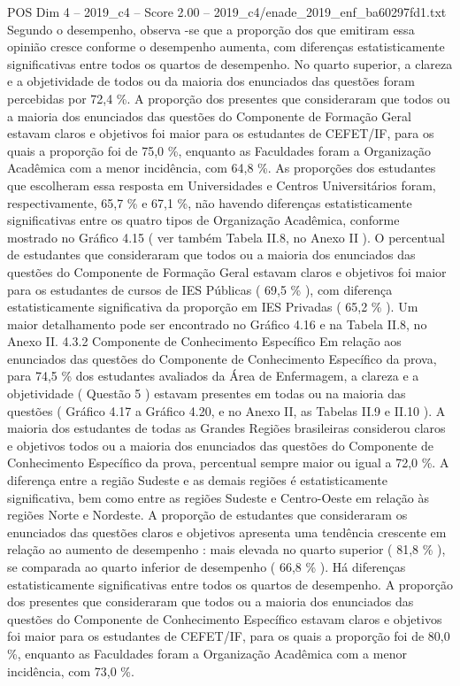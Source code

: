 \begin{textsample}{POS Dim 4 – 2019\_c4 – Score 2.00 – 2019\_c4/enade\_2019\_enf\_ba60297fd1.txt}
Segundo o desempenho, observa -se que a proporção dos que emitiram essa opinião cresce conforme o desempenho aumenta, com diferenças estatisticamente significativas entre todos os quartos de desempenho.
No quarto superior, a clareza e a objetividade de todos ou da maioria dos enunciados das questões foram percebidas por 72,4 \%.
A proporção dos presentes que consideraram que todos ou a maioria dos enunciados das questões do Componente de Formação Geral estavam claros e objetivos foi maior para os estudantes de CEFET/IF, para os quais a proporção foi de 75,0 \%, enquanto as Faculdades foram a Organização Acadêmica com a menor incidência, com 64,8 \%.
As proporções dos estudantes que escolheram essa resposta em Universidades e Centros Universitários foram, respectivamente, 65,7 \% e 67,1 \%, não havendo diferenças estatisticamente significativas entre os quatro tipos de Organização Acadêmica, conforme mostrado no Gráfico 4.15 ( ver também Tabela II.8, no Anexo II ).
O percentual de estudantes que consideraram que todos ou a maioria dos enunciados das questões do Componente de Formação Geral estavam claros e objetivos foi maior para os estudantes de cursos de IES Públicas ( 69,5 \% ), com diferença estatisticamente significativa da proporção em IES Privadas ( 65,2 \% ).
Um maior detalhamento pode ser encontrado no Gráfico 4.16 e na Tabela II.8, no Anexo II. 4.3.2 Componente de Conhecimento Específico Em relação aos enunciados das questões do Componente de Conhecimento Específico da prova, para 74,5 \% dos estudantes avaliados da Área de Enfermagem, a clareza e a objetividade ( Questão 5 ) estavam presentes em todas ou na maioria das questões ( Gráfico 4.17 a Gráfico 4.20, e no Anexo II, as Tabelas II.9 e II.10 ).
A maioria dos estudantes de todas as Grandes Regiões brasileiras considerou claros e objetivos todos ou a maioria dos enunciados das questões do Componente de Conhecimento Específico da prova, percentual sempre maior ou igual a 72,0 \%.
A diferença entre a região Sudeste e as demais regiões é estatisticamente significativa, bem como entre as regiões Sudeste e Centro-Oeste em relação às regiões Norte e Nordeste.
A proporção de estudantes que consideraram os enunciados das questões claros e objetivos apresenta uma tendência crescente em relação ao aumento de desempenho : mais elevada no quarto superior ( 81,8 \% ), se comparada ao quarto inferior de desempenho ( 66,8 \% ).
Há diferenças estatisticamente significativas entre todos os quartos de desempenho.
A proporção dos presentes que consideraram que todos ou a maioria dos enunciados das questões do Componente de Conhecimento Específico estavam claros e objetivos foi maior para os estudantes de CEFET/IF, para os quais a proporção foi de 80,0 \%, enquanto as Faculdades foram a Organização Acadêmica com a menor incidência, com 73,0 \%.

\end{textsample}
